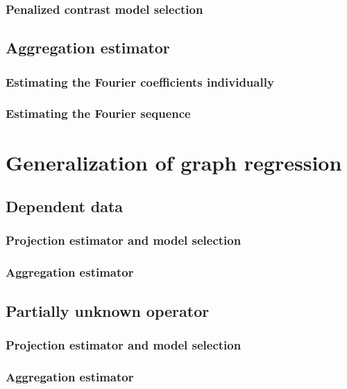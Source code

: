 \documentclass[a4paper,11pt]{book}
\theoremstyle{custom}
\begin{document}
\subsection{Penalized contrast model selection}

\section{Aggregation estimator}

\subsection{Estimating the Fourier coefficients individually}
\subsection{Estimating the Fourier sequence}


\chapter{Generalization of graph regression}
\section{Dependent data}
\subsection{Projection estimator and model selection}
\subsection{Aggregation estimator}

\section{Partially unknown operator}
\subsection{Projection estimator and model selection}
\subsection{Aggregation estimator}

{}
\nocite{*}

\end{document}
